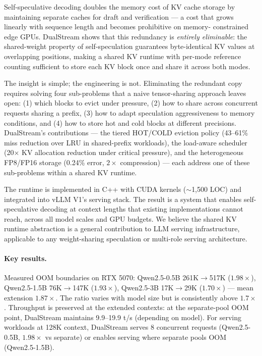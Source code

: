 \documentclass[review]{elsarticle}
\theoremstyle{definition}
\theoremstyle{remark}
\begin{document}
Self-speculative decoding doubles the memory cost of KV cache storage
by maintaining separate caches for draft and verification --- a cost that
grows linearly with sequence length and becomes prohibitive on memory-
constrained edge GPUs. DualStream shows that this redundancy is
\emph{entirely eliminable}: the shared-weight property of self-speculation
guarantees byte-identical KV values at overlapping positions, making a
shared KV runtime with per-mode reference counting sufficient to store
each KV block once and share it across both modes.

The insight is simple; the engineering is not. Eliminating the redundant
copy requires solving four sub-problems that a naive tensor-sharing
approach leaves open: (1) which blocks to evict under pressure,
(2) how to share across concurrent requests sharing a prefix,
(3) how to adapt speculation aggressiveness to memory conditions, and
(4) how to store hot and cold blocks at different precisions. DualStream's
contributions --- the tiered HOT/COLD eviction policy (43--61\% miss
reduction over LRU in shared-prefix workloads), the load-aware scheduler
(20$\times$ KV allocation reduction under critical pressure), and the
heterogeneous FP8/FP16 storage (0.24\% error, $2\times$ compression) ---
each address one of these sub-problems within a shared KV runtime.

The runtime is implemented in C++ with CUDA kernels ($\sim$1,500 LOC)
and integrated into vLLM V1's serving stack. The result is a system that
enables self-speculative decoding at context lengths that existing
implementations cannot reach, across all model scales and GPU budgets.
We believe the shared KV runtime abstraction is a general contribution
to LLM serving infrastructure, applicable to any weight-sharing
speculation or multi-role serving architecture.

\paragraph{Key results.}
Measured OOM boundaries on RTX 5070: Qwen2.5-0.5B 261K$\to$517K
($1.98\times$), Qwen2.5-1.5B 76K$\to$147K ($1.93\times$), Qwen2.5-3B
17K$\to$29K ($1.70\times$) --- mean extension $1.87\times$. The ratio
varies with model size but is consistently above $1.7\times$. Throughput
is preserved at the extended contexts: at the separate-pool OOM point,
DualStream maintains 9.9--19.9 t/s (depending on model). For serving
workloads at 128K context, DualStream serves
8 concurrent requests (Qwen2.5-0.5B, $1.98\times$ vs separate) or
enables serving where separate pools OOM (Qwen2.5-1.5B).
\end{document}
